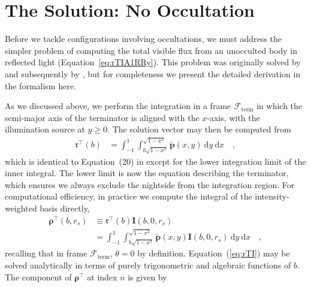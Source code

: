 \documentclass[modern]{aastex62}
\newcommand{\BF}[1]{\ensuremath{\mathbf{#1}}}
\newcommand{\BS}[1]{\ensuremath{\boldsymbol{#1}}}
\newcommand{\dd}{\ensuremath{\mathrm{d}}}
\newcommand{\rT}{\ensuremath{\mathfrak{r}^\top}}
\newcommand{\bp}{\ensuremath{\tilde{\BF{p}}}}
\begin{document}
%

\section{The Solution: No Occultation}
\label{sec:solution-no-occ}
%
Before we tackle configurations involving occultations, we must address the
simpler problem of computing the total visible flux from an unocculted
body in reflected light (Equation~\ref{eq:rTIA1RRy}). This problem was
originally solved by \citet{Haggard2018} and subsequently by
\citet{Luger2019b}, but for completeness we present the detailed
derivation in the \starry formalism here.

As we discussed above, we perform the integration in a frame
$\mathcal{F}_\mathrm{term}$
in which the semi-major axis of the terminator is aligned with the
$x$-axis, with the illumination source at $y \ge 0$.
The solution vector may then be computed from
%
\begin{align}
    \label{eq:rT}
    \rT(b) & =
    \int_{-1}^{1}
    \int_{b\sqrt{1 - x^2}}^{\sqrt{1 - x^2}}
    \bp(x, y)
    \ \dd y \ \dd x
    \quad,
\end{align}
%
which is identical to Equation~(20) in \citet{Luger2019} except for the
lower integration limit of the inner integral. The lower limit is now
the equation describing the terminator, which ensures we always exclude the
nightside from the integration region.
%
For computational efficiency, in practice we compute the integral of the
intensity-weighted basis directly,
%
\begin{align}
    \label{eq:rTI}
    \BS{\rho}^\top(b, r_s) & \equiv
    \rT(b) \mathbf{I}(b, 0, r_s)
    \nonumber                       \\
                           & =
    \int_{-1}^{1}
    \int_{b\sqrt{1 - x^2}}^{\sqrt{1 - x^2}}
    \bp(x, y)
    \mathbf{I}(b, 0, r_s)
    \ \dd y \ \dd x
    \quad,
\end{align}
%
recalling that in frame $\mathcal{F}_\mathrm{term}$, $\theta = 0$ by
definition.
%
Equation~(\ref{eq:rTI}) may be solved analytically in terms of purely
trigonometric and algebraic functions of $b$. The component of $\BS{\rho}^\top$
at index $n$ is given by
%
\end{document}
